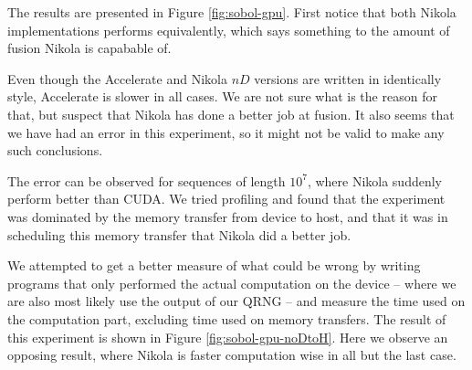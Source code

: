 The results are presented in Figure \ref{fig:sobol-gpu}. First notice
that both Nikola implementations performs equivalently, which says
something to the amount of fusion Nikola is capabable of. 

Even though the Accelerate and Nikola $nD$ versions are written in
identically style, Accelerate is slower in all cases. We are not sure
what is the reason for that, but suspect that Nikola has done a better
job at fusion. It also seems that we have had an error in this
experiment, so it might not be valid to make any such conclusions.

The error can be observed for sequences of length $10^7$, where Nikola
suddenly perform better than CUDA. We tried profiling and found that
the experiment was dominated by the memory transfer from device to
host, and that it was in scheduling this memory transfer that Nikola
did a better job.

We attempted to get a better measure of what could be wrong by writing
programs that only performed the actual computation on the device --
where we are also most likely use the output of our QRNG -- and
measure the time used on the computation part, excluding time used on
memory transfers. The result of this experiment is shown in Figure
\ref{fig:sobol-gpu-noDtoH}. Here we observe an opposing result, where
Nikola is faster computation wise in all but the last case.








